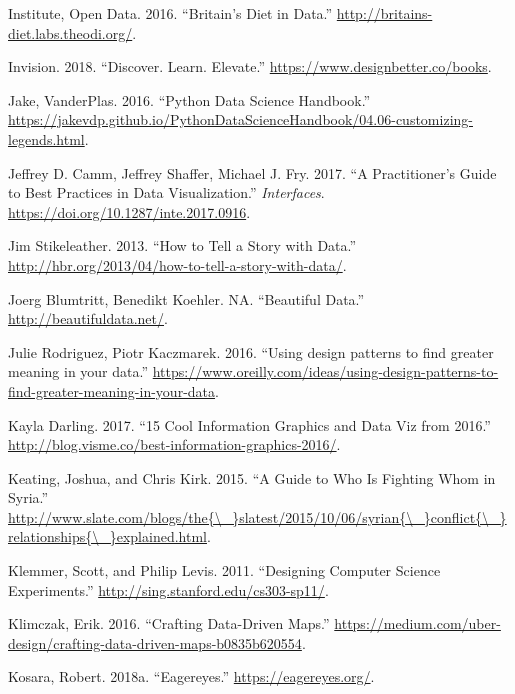 \documentclass[]{book}
\begin{document}
\hypertarget{ref-britain_diet_2016}{}
Institute, Open Data. 2016. ``Britain's Diet in Data.''
\url{http://britains-diet.labs.theodi.org/}.

\hypertarget{ref-invision}{}
Invision. 2018. ``Discover. Learn. Elevate.''
\url{https://www.designbetter.co/books}.

\hypertarget{ref-PythonDataScienceHandbook}{}
Jake, VanderPlas. 2016. ``Python Data Science Handbook.''
\url{https://jakevdp.github.io/PythonDataScienceHandbook/04.06-customizing-legends.html}.

\hypertarget{ref-practitioners_guide}{}
Jeffrey D. Camm, Jeffrey Shaffer, Michael J. Fry. 2017. ``A
Practitioner's Guide to Best Practices in Data Visualization.''
\emph{Interfaces}. \url{https://doi.org/10.1287/inte.2017.0916}.

\hypertarget{ref-storytelling_with_data}{}
Jim Stikeleather. 2013. ``How to Tell a Story with Data.''
\url{http://hbr.org/2013/04/how-to-tell-a-story-with-data/}.

\hypertarget{ref-Beautiful_data}{}
Joerg Blumtritt, Benedikt Koehler. NA. ``Beautiful Data.''
\url{http://beautifuldata.net/}.

\hypertarget{ref-greater}{}
Julie Rodriguez, Piotr Kaczmarek. 2016. ``Using design patterns to find
greater meaning in your data.''
\url{https://www.oreilly.com/ideas/using-design-patterns-to-find-greater-meaning-in-your-data}.

\hypertarget{ref-cool_data}{}
Kayla Darling. 2017. ``15 Cool Information Graphics and Data Viz from
2016.'' \url{http://blog.visme.co/best-information-graphics-2016/}.

\hypertarget{ref-syria_chart}{}
Keating, Joshua, and Chris Kirk. 2015. ``A Guide to Who Is Fighting Whom
in Syria.''
\href{http://www.slate.com/blogs/the\%7B/_\%7Dslatest/2015/10/06/syrian\%7B/_\%7Dconflict\%7B/_\%7Drelationships\%7B/_\%7Dexplained.html}{http://www.slate.com/blogs/the\{\textbackslash{}\_\}slatest/2015/10/06/syrian\{\textbackslash{}\_\}conflict\{\textbackslash{}\_\}relationships\{\textbackslash{}\_\}explained.html}.

\hypertarget{ref-stanford_course}{}
Klemmer, Scott, and Philip Levis. 2011. ``Designing Computer Science
Experiments.'' \url{http://sing.stanford.edu/cs303-sp11/}.

\hypertarget{ref-uber_maps}{}
Klimczak, Erik. 2016. ``Crafting Data-Driven Maps.''
\url{https://medium.com/uber-design/crafting-data-driven-maps-b0835b620554}.

\hypertarget{ref-eagereyes_viz}{}
Kosara, Robert. 2018a. ``Eagereyes.'' \url{https://eagereyes.org/}.
\end{document}
